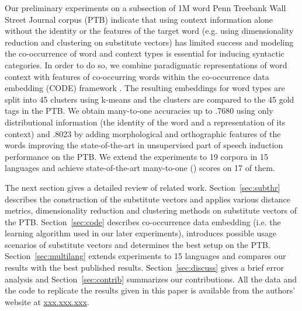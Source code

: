 Our preliminary experiments on a subsection of 1M word Penn Treebank
Wall Street Journal corpus (PTB) \cite{treebank3} indicate that using
context information alone without the identity or the features of the
target word (e.g. using dimensionality reduction and clustering on
substitute vectors) has limited success and modeling the co-occurrence
of word and context types is essential for inducing syntactic
categories.  In order to do so, we combine paradigmatic
representations of word context with features of co-occurring words
within the co-occurrence data embedding (CODE) framework
\cite{globerson2007euclidean,maron2010sphere}.  The resulting
embeddings for word types are split into 45 clusters using k-means and
the clusters are compared to the 45 gold tags in the PTB.  We obtain
many-to-one accuracies up to .7680 using only distributional
information (the identity of the word and a representation of its
context) and .8023 by adding morphological and orthographic features
of the words improving the state-of-the-art in unsupervised part of
speech induction performance on the PTB.  We extend the experiments to
19 corpora in 15 languages and achieve state-of-the-art many-to-one
(\mto) scores on 17 of them.

The next section gives a detailed review of related work.
Section~\ref{sec:subthr} describes the construction of the substitute
vectors and applies various distance metrics, dimensionality reduction
and clustering methods on substitute vectors of the PTB.
Section~\ref{sec:code} describes co-occurrence data embedding
(i.e. the learning algorithm used in our later experiments),
introduces possible usage scenarios of substitute vectors and
determines the best setup on the PTB.  Section~\ref{sec:multilang}
extends experiments to 15 languages and compares our results with the
best published results.  Section~\ref{sec:discuss} gives a brief error
analysis and Section~\ref{sec:contrib} summarizes our contributions.
All the data and the code to replicate the results given in this paper
is available from the authors' website at \mbox{\url{xxx.xxx.xxx}}.


